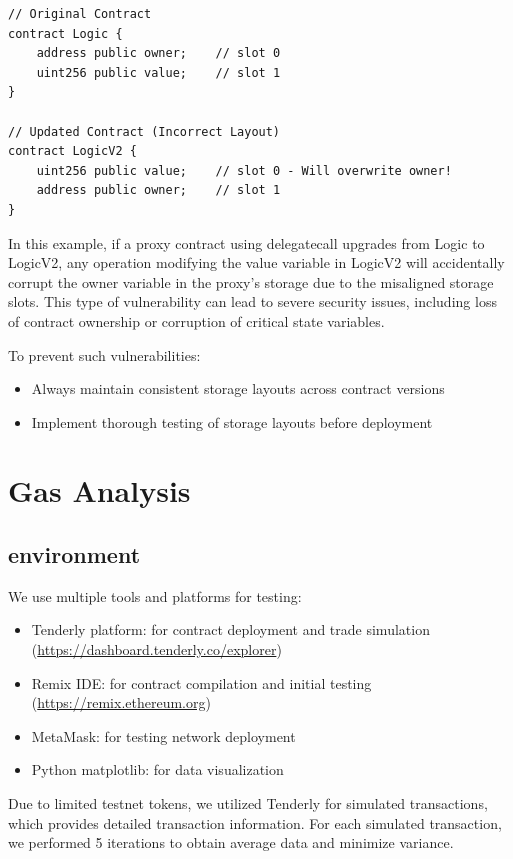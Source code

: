 \documentclass[conference]{IEEEtran}
\begin{document}
\begin{lstlisting}[style=solidity]
// Original Contract
contract Logic {
    address public owner;    // slot 0
    uint256 public value;    // slot 1
}

// Updated Contract (Incorrect Layout)
contract LogicV2 {
    uint256 public value;    // slot 0 - Will overwrite owner!
    address public owner;    // slot 1
}
\end{lstlisting}

In this example, if a proxy contract using delegatecall upgrades from Logic to LogicV2, any operation modifying the value variable in LogicV2 will accidentally corrupt the owner variable in the proxy's storage due to the misaligned storage slots. This type of vulnerability can lead to severe security issues, including loss of contract ownership or corruption of critical state variables.

To prevent such vulnerabilities:
\begin{itemize}
    \item Always maintain consistent storage layouts across contract versions
    \item Implement thorough testing of storage layouts before deployment
\end{itemize}

\vspace{3em}
\section{Gas Analysis}
\subsection{\textbf{environment}}
We use multiple tools and platforms for testing:
\begin{itemize}
    \item Tenderly platform: for contract deployment and trade simulation (\url{https://dashboard.tenderly.co/explorer})
    \item Remix IDE: for contract compilation and initial testing (\url{https://remix.ethereum.org})
    \item MetaMask: for testing network deployment
    \item Python matplotlib: for data visualization
\end{itemize}

Due to limited testnet tokens, we utilized Tenderly for simulated transactions, which provides detailed transaction information. For each simulated transaction, we performed 5 iterations to obtain average data and minimize variance.
\end{document}
